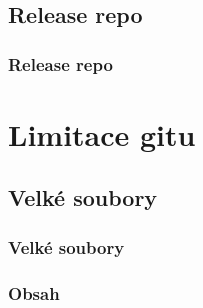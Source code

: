\documentclass[pdftex]{beamer}
\begin{document}
\subsection{Release repo}

\begin{frame}
	\frametitle{Release repo}
\end{frame}

\section{Limitace gitu}
\subsection{Velké soubory}

\begin{frame}
	\frametitle{Velké soubory}
\end{frame}





\begin{frame}
\frametitle{Obsah}
	\tableofcontents
\end{frame}
\end{document}
